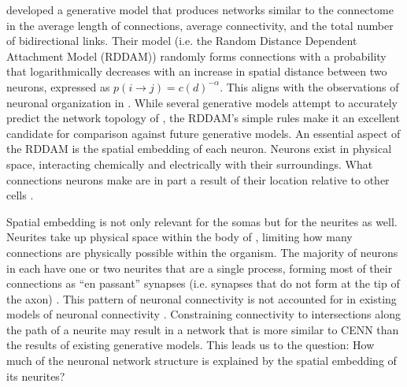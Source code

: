 \cite{Itzhack} developed a generative model that produces networks similar to the \ce connectome in the average length of connections, average connectivity, and the total number of bidirectional links. 
Their model (i.e. the Random Distance Dependent Attachment Model (RDDAM)) randomly forms connections with a probability that logarithmically decreases with an increase in spatial distance between two neurons, expressed as $p(i \rightarrow j)= c(d)^{-\alpha}$.
This aligns with the observations of neuronal organization in \ce \citep{PerezEscudero}.
While several generative models attempt to accurately predict the network topology of \ce \citep{Costa, Khajezade, Nicosia}, the RDDAM’s simple rules make it an excellent candidate for comparison against future generative models.
An essential aspect of the RDDAM is the spatial embedding of each neuron. 
Neurons exist in physical space, interacting chemically and electrically with their surroundings. 
What connections neurons make are in part a result of their location relative to other cells \citep{Hentschel, Kaiser, PerezEscudero}.

Spatial embedding is not only relevant for the somas but for the neurites as well. 
Neurites take up physical space within the body of \ce, limiting how many connections are physically possible within the organism. 
The majority of neurons in \ce each have one or two neurites that are a single process, forming most of their connections as “en passant” synapses (i.e. synapses that do not form at the tip of the axon) \citep{Durbin, White}. 
This pattern of neuronal connectivity is not accounted for in existing models of \ce neuronal connectivity \citep{Costa, Itzhack, Khajezade, Nicosia}. 
Constraining connectivity to intersections along the path of a neurite may result in a network that is more similar to CENN than the results of existing generative models. 
This leads us to the question: How much of the \ce neuronal network structure is explained by the spatial embedding of its neurites?